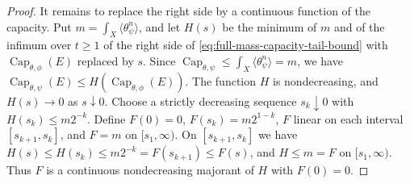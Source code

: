 \begin{proof}
It remains to replace the right side by a continuous function of the capacity. Put $m=\int_X\langle\theta_\psi^n\rangle$, and let $H(s)$ be the minimum of $m$ and of the infimum over $t\geq1$ of the right side of \eqref{eq:full-mass-capacity-tail-bound} with $\operatorname{Cap}_{\theta,\phi}(E)$ replaced by $s$. Since $\operatorname{Cap}_{\theta,\psi}\leq\int_X\langle\theta_\psi^n\rangle=m$, we have $\operatorname{Cap}_{\theta,\psi}(E)\leq H(\operatorname{Cap}_{\theta,\phi}(E))$. The function $H$ is nondecreasing, and $H(s)\to0$ as $s\downarrow0$. Choose a strictly decreasing sequence $s_k\downarrow0$ with $H(s_k)\leq m2^{-k}$. Define $F(0)=0$, $F(s_k)=m2^{1-k}$, $F$ linear on each interval $[s_{k+1},s_k]$, and $F=m$ on $[s_1,\infty)$. On $[s_{k+1},s_k]$ we have $H(s)\leq H(s_k)\leq m2^{-k}=F(s_{k+1})\leq F(s)$, and $H\leq m=F$ on $[s_1,\infty)$. Thus $F$ is a continuous nondecreasing majorant of $H$ with $F(0)=0$.
\end{proof}

